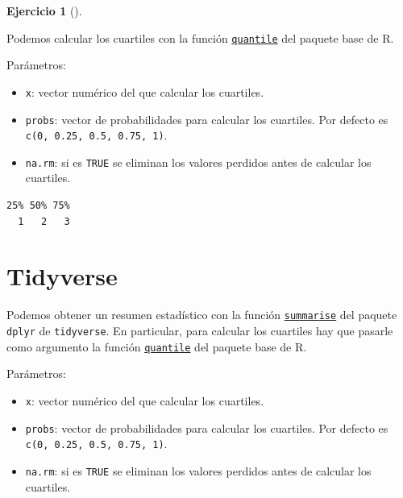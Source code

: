 \documentclass[
  a4paper,
]{scrreport}
\newenvironment{Shaded}{\begin{snugshade}}{\end{snugshade}}
\newcommand{\AttributeTok}[1]{\textcolor[rgb]{0.40,0.45,0.13}{#1}}
\newcommand{\FloatTok}[1]{\textcolor[rgb]{0.68,0.00,0.00}{#1}}
\newcommand{\FunctionTok}[1]{\textcolor[rgb]{0.28,0.35,0.67}{#1}}
\newcommand{\NormalTok}[1]{\textcolor[rgb]{0.00,0.23,0.31}{#1}}
\newcommand{\SpecialCharTok}[1]{\textcolor[rgb]{0.37,0.37,0.37}{#1}}
\providecommand{\tightlist}{%
  \setlength{\itemsep}{0pt}\setlength{\parskip}{0pt}}\usepackage{longtable,booktabs,array}
\theoremstyle{definition}
\newtheorem{exercise}{Ejercicio}[chapter]
\theoremstyle{remark}
\begin{document}
\begin{exercise}[]
\begin{enumerate}
\begin{tcolorbox}
  Podemos calcular los cuartiles con la función
  \href{https://www.rdocumentation.org/packages/base/versions/3.6.2/topics/quantile}{\texttt{quantile}}
  del paquete base de R.

  Parámetros:

  \begin{itemize}
  \tightlist
  \item
    \texttt{x}: vector numérico del que calcular los cuartiles.
  \item
    \texttt{probs}: vector de probabilidades para calcular los
    cuartiles. Por defecto es \texttt{c(0,\ 0.25,\ 0.5,\ 0.75,\ 1)}.
  \item
    \texttt{na.rm}: si es \texttt{TRUE} se eliminan los valores perdidos
    antes de calcular los cuartiles.
  \end{itemize}

\begin{Shaded}
\end{Shaded}

\begin{verbatim}
25% 50% 75% 
  1   2   3 
\end{verbatim}

  \section{Tidyverse}

  Podemos obtener un resumen estadístico con la función
  \href{https://dplyr.tidyverse.org/reference/summarise.html}{\texttt{summarise}}
  del paquete \texttt{dplyr} de \texttt{tidyverse}. En particular, para
  calcular los cuartiles hay que pasarle como argumento la función
  \href{https://www.rdocumentation.org/packages/base/versions/3.6.2/topics/quantile}{\texttt{quantile}}
  del paquete base de R.

  Parámetros:

  \begin{itemize}
  \tightlist
  \item
    \texttt{x}: vector numérico del que calcular los cuartiles.
  \item
    \texttt{probs}: vector de probabilidades para calcular los
    cuartiles. Por defecto es \texttt{c(0,\ 0.25,\ 0.5,\ 0.75,\ 1)}.
  \item
    \texttt{na.rm}: si es \texttt{TRUE} se eliminan los valores perdidos
    antes de calcular los cuartiles.
  \end{itemize}


\end{tcolorbox}
\end{enumerate}
\end{exercise}
\end{document}

